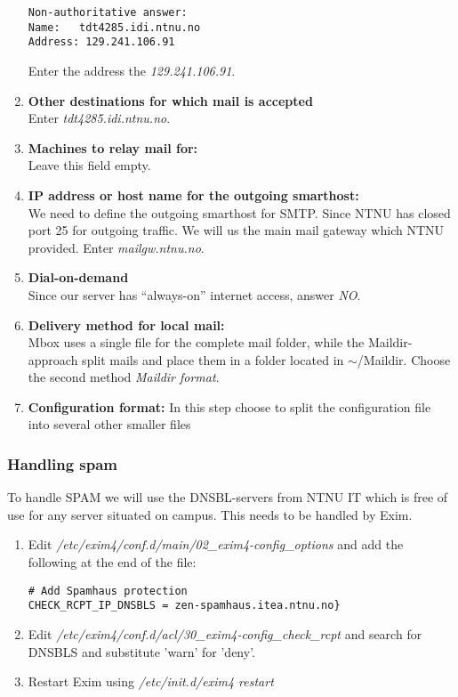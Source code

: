 \begin{enumerate}
\begin{lstlisting}
Non-authoritative answer:
Name:	tdt4285.idi.ntnu.no
Address: 129.241.106.91
\end{lstlisting}
Enter the address the \emph{129.241.106.91}.
\item\textbf{Other destinations for which mail is accepted}\\
Enter \emph{tdt4285.idi.ntnu.no}.
\item\textbf{Machines to relay mail for:}\\
Leave this field empty.
\item\textbf{IP address or host name for the outgoing smarthost:}\\
We need to define the outgoing smarthost for SMTP. Since NTNU has closed
port 25 for outgoing traffic. We will us the main mail gateway which
NTNU provided. Enter \emph{mailgw.ntnu.no}.
\item\textbf{Dial-on-demand}\\
Since our server has ``always-on'' internet access, answer \emph{NO}.
\item\textbf{Delivery method for local mail:}\\
Mbox uses a single file for the complete mail folder, while the
Maildir-approach split mails and place them in a folder located in
$\sim$/Maildir. Choose the second method \emph{Maildir format}.
\item\textbf{Configuration format:}
In this step choose to split the configuration file into several other
smaller files
\end{enumerate}

\subsubsection{Handling spam}
To handle SPAM we will use the DNSBL-servers from NTNU IT which is free of use
for any server situated on campus. This needs to be handled by Exim.

\begin{enumerate}
  \item Edit \emph{/etc/exim4/conf.d/main/02\_exim4-config\_options} and add the following at the end of the file:
\begin{lstlisting}
# Add Spamhaus protection
CHECK_RCPT_IP_DNSBLS = zen-spamhaus.itea.ntnu.no}
\end{lstlisting}

\item Edit \emph{/etc/exim4/conf.d/acl/30\_exim4-config\_check\_rcpt} and search for DNSBLS and substitute 'warn' for 'deny'.

\item Restart Exim using \emph{/etc/init.d/exim4 restart}
\end{enumerate}

